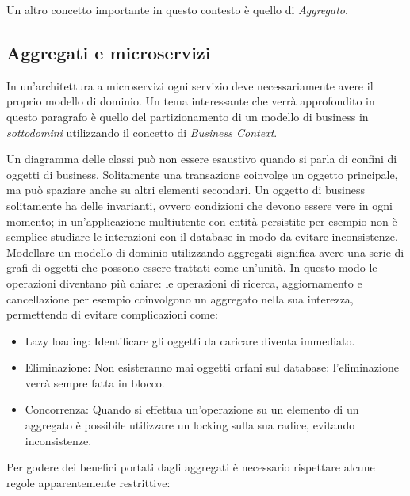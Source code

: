 Un altro concetto importante in questo contesto è quello di \textit{Aggregato}.

\subsection{Aggregati e microservizi}
In un'architettura a microservizi ogni servizio deve necessariamente avere il proprio modello di dominio.
Un tema interessante che verrà approfondito in questo paragrafo è quello del partizionamento di un modello di business in \textit{sottodomini} utilizzando il concetto di \textit{Business Context}.

Un diagramma delle classi può non essere esaustivo quando si parla di confini di oggetti di business.
Solitamente una transazione coinvolge un oggetto principale, ma può spaziare anche su altri elementi secondari.
Un oggetto di business solitamente ha delle invarianti, ovvero condizioni che devono essere vere in ogni momento; in un'applicazione multiutente con entità persistite per esempio non è semplice studiare le interazioni con il database in modo da evitare inconsistenze.\\
Modellare un modello di dominio utilizzando aggregati significa avere una serie di grafi di oggetti che possono essere trattati come un'unità.
In questo modo le operazioni diventano più chiare: le operazioni di ricerca, aggiornamento e cancellazione per esempio coinvolgono un aggregato nella sua interezza, permettendo di evitare complicazioni come:
\begin{itemize}
	\item Lazy loading: Identificare gli oggetti da caricare diventa immediato.
	\item Eliminazione: Non esisteranno mai oggetti orfani sul database: l'eliminazione verrà sempre fatta in blocco.
	\item Concorrenza: Quando si effettua un'operazione su un elemento di un aggregato è possibile utilizzare un locking sulla sua radice, evitando inconsistenze.
\end{itemize}

Per godere dei benefici portati dagli aggregati è necessario rispettare alcune regole apparentemente restrittive:

